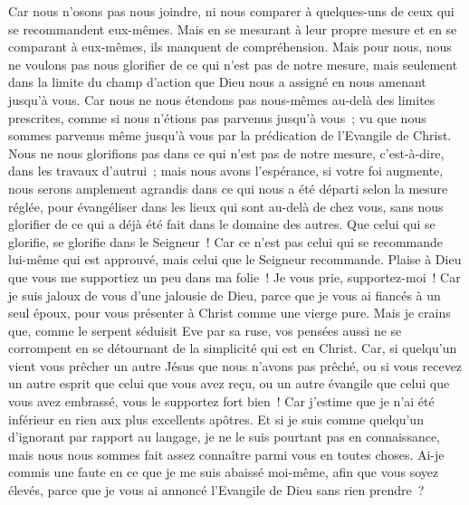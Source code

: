 \begin{multicols}{2}
Car nous n'osons pas nous joindre, ni nous comparer à quelques-uns de ceux qui se recommandent eux-mêmes. Mais en se mesurant à leur propre mesure et en se comparant à eux-mêmes, ils manquent de compréhension.
Mais pour nous, nous ne voulons pas nous glorifier de ce qui n'est pas de notre mesure, mais seulement dans la limite du champ d'action que Dieu nous a assigné en nous amenant jusqu'à vous.
Car nous ne nous étendons pas nous-mêmes au-delà des limites prescrites, comme si nous n'étions pas parvenus jusqu'à vous~; vu que nous sommes parvenus même jusqu'à vous par la prédication de l'Evangile de Christ.
Nous ne nous glorifions pas dans ce qui n'est pas de notre mesure, c'est-à-dire, dans les travaux d'autrui~; mais nous avons l'espérance, si votre foi augmente, nous serons amplement agrandis dans ce qui nous a été départi selon la mesure réglée,
pour évangéliser dans les lieux qui sont au-delà de chez vous, sans nous glorifier de ce qui a déjà été fait dans le domaine des autres.
Que celui qui se glorifie, se glorifie dans le Seigneur~!
Car ce n'est pas celui qui se recommande lui-même qui est approuvé, mais celui que le Seigneur recommande.
\VerseOne{}Plaise à Dieu que vous me supportiez un peu dans ma folie~! Je vous prie, supportez-moi~!
Car je suis jaloux de vous d'une jalousie de Dieu, parce que je vous ai fiancés à un seul époux, pour vous présenter à Christ comme une vierge pure.
Mais je crains que, comme le serpent séduisit Eve par sa ruse, vos pensées aussi ne se corrompent en se détournant de la simplicité qui est en Christ.
Car, si quelqu'un vient vous prêcher un autre Jésus que nous n'avons pas prêché, ou si vous recevez un autre esprit que celui que vous avez reçu, ou un autre évangile que celui que vous avez embrassé, vous le supportez fort bien~!
Car j'estime que je n'ai été inférieur en rien aux plus excellents apôtres.
Et si je suis comme quelqu'un d'ignorant par rapport au langage, je ne le suis pourtant pas en connaissance, mais nous nous sommes fait assez connaître parmi vous en toutes choses.
Ai-je commis une faute en ce que je me suis abaissé moi-même, afin que vous soyez élevés, parce que je vous ai annoncé l'Evangile de Dieu sans rien prendre~?

\end{multicols}
